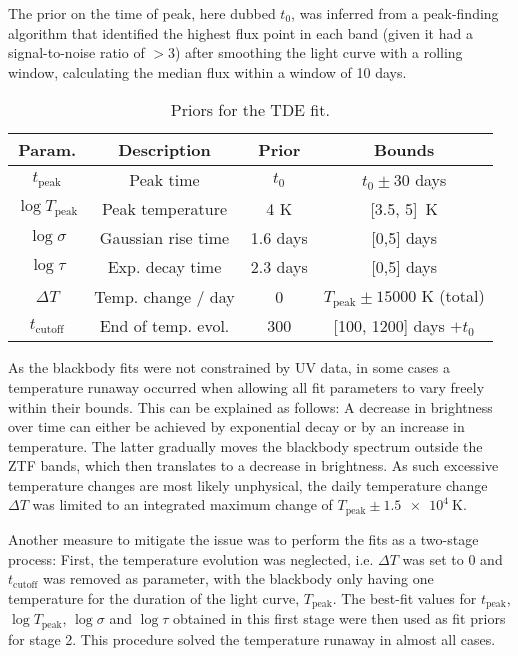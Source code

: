 The prior on the time of peak, here dubbed $t_0$, was inferred from a peak-finding algorithm that identified the highest flux point in each band (given it had a signal-to-noise ratio of $>3$) after smoothing the light curve with a rolling window, calculating the median flux within a window of 10 days.

\begin{table}[h]
  \begin{center}
    \begin{tabular}{c c c c}
      \hline
      \textbf{Param.}      & \textbf{Description} & \textbf{Prior} & \textbf{Bounds}                     \\
      \hline
      \hline
      $t_\text{peak}$      & Peak time            & $t_0$          & $t­_0 \pm 30$ days                  \\
      $\log T_\text{peak}$ & Peak temperature     & 4 K            & [3.5, 5]~\unit{\K}                  \\
      $\log \sigma$        & Gaussian rise time   & 1.6 days       & [0,5] days                          \\
      $\log \tau$          & Exp. decay time      & 2.3 days       & [0,5] days                          \\
      $\Delta T$           & Temp. change / day   & 0              & $T_\text{peak} \pm 15000$ K (total) \\
      $t_\text{cutoff}$    & End of temp. evol.   & 300            & [100, 1200] days $+t_0$             \\
      \hline
    \end{tabular}
  \end{center}
  \caption[TDE Fit priors]{Priors for the TDE fit.}\label{tab:tde_fit_priors}
\end{table}

As the blackbody fits were not constrained by UV data, in some cases a temperature runaway occurred when allowing all fit parameters to vary freely within their bounds. This can be explained as follows: A decrease in brightness over time can either be achieved by exponential decay or by an increase in temperature. The latter gradually moves the blackbody spectrum outside the ZTF bands, which then translates to a decrease in brightness. As such excessive temperature changes are most likely unphysical, the daily temperature change $\Delta T$ was limited to an integrated maximum change of $T_\text{peak} \pm \SI{1.5e4}{\K}$.

Another measure to mitigate the issue was to perform the fits as a two-stage process: First, the temperature evolution was neglected, i.e. $\Delta T$ was set to $0$ and $t_\text{cutoff}$ was removed as parameter, with the blackbody only having one temperature for the duration of the light curve, $T_\text{peak}$. The best-fit values for $t_\text{peak}$, $\log T_\text{peak}$, $\log \sigma$ and $\log \tau$ obtained in this first stage were then used as fit priors for stage 2. This procedure solved the temperature runaway in almost all cases.

